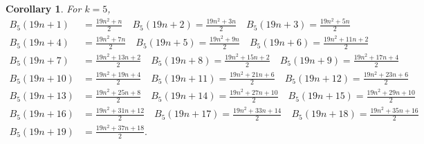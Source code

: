 \documentclass[11pt,reqno]{amsart}
\theoremstyle{plain}
\newtheorem{corollary}[theorem]{Corollary}
\theoremstyle{definition}
\theoremstyle{remark}
\numberwithin{equation}{section}
\numberwithin{equation}{section}
\begin{document}
\begin{corollary}

For $k=5$,
\begin{align*}
    B_5(19n+1)&=\frac{19n^2+n}{2}\quad
    B_5(19n+2)=\frac{19n^2+3n}{2}\quad
    B_5(19n+3)=\frac{19n^2+5n}{2}\\
    B_5(19n+4)&=\frac{19n^2+7n}{2}\quad
    B_5(19n+5)=\frac{19n^2+9n}{2}\quad
    B_5(19n+6)=\frac{19n^2+11n+2}{2}\\
    B_5(19n+7)&=\frac{19n^2+13n+2}{2}\quad
    B_5(19n+8)=\frac{19n^2+15n+2}{2}\quad
    B_5(19n+9)=\frac{19n^2+17n+4}{2}\\
    B_5(19n+10)&=\frac{19n^2+19n+4}{2}\quad
    B_5(19n+11)=\frac{19n^2+21n+6}{2}\quad
    B_5(19n+12)=\frac{19n^2+23n+6}{2}\\
    B_5(19n+13)&=\frac{19n^2+25n+8}{2}\quad
    B_5(19n+14)=\frac{19n^2+27n+10}{2}\quad
    B_5(19n+15)=\frac{19n^2+29n+10}{2}\\
    B_5(19n+16)&=\frac{19n^2+31n+12}{2}\quad
    B_5(19n+17)=\frac{19n^2+33n+14}{2}\quad
    B_5(19n+18)=\frac{19n^2+35n+16}{2}\\
    B_5(19n+19)&=\frac{19n^2+37n+18}{2}.
\end{align*}

\end{corollary}


 
\end{document}
